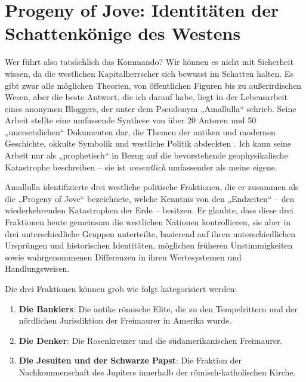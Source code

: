\documentclass[10pt,twocolumn,letterpaper]{article}
\begin{document}
\section{Progeny of Jove: Identitäten der Schattenkönige des Westens}

Wer führt also tatsächlich das Kommando? Wir können es nicht mit Sicherheit wissen, da die westlichen Kapitalherrscher sich bewusst im Schatten halten. Es gibt zwar alle möglichen Theorien, von öffentlichen Figuren bis zu außerirdischen Wesen, aber die beste Antwort, die ich darauf habe, liegt in der Lebensarbeit eines anonymen Bloggers, der unter dem Pseudonym „Amallulla“ schrieb. Seine Arbeit stellte eine umfassende Synthese von über 20 Autoren und 50 „unersetzlichen“ Dokumenten dar, die Themen der antiken und modernen Geschichte, okkulte Symbolik und westliche Politik abdeckten \cite{33,34}. Ich kann seine Arbeit nur als „prophetisch“ in Bezug auf die bevorstehende geophysikalische Katastrophe beschreiben – sie ist \textit{wesentlich} umfassender als meine eigene.

Amallulla identifizierte drei westliche politische Fraktionen, die er zusammen als die „Progeny of Jove“ bezeichnete, welche Kenntnis von den „Endzeiten“ – den wiederkehrenden Katastrophen der Erde – besitzen. Er glaubte, dass diese drei Fraktionen heute gemeinsam die westlichen Nationen kontrollieren, sie aber in drei unterschiedliche Gruppen unterteilte, basierend auf ihren unterschiedlichen Ursprüngen und historischen Identitäten, möglichen früheren Unstimmigkeiten sowie wahrgenommenen Differenzen in ihren Wertesystemen und Handlungsweisen.

Die drei Fraktionen können grob wie folgt kategorisiert werden:

\begin{flushleft}
\begin{enumerate}
    \item \textbf{Die Bankiers}: Die antike römische Elite, die zu den Tempelrittern und der nördlichen Jurisdiktion der Freimaurer in Amerika wurde.
    \item \textbf{Die Denker}: Die Rosenkreuzer und die südamerikanischen Freimaurer.
    \item \textbf{Die Jesuiten und der Schwarze Papst}: Die Fraktion der Nachkommenschaft des Jupiters innerhalb der römisch-katholischen Kirche.
\end{enumerate}
\end{flushleft}
\end{document}
